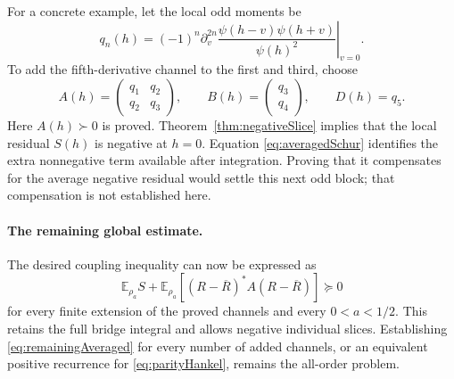 For a concrete example, let the local odd moments be
\[
q_n(h)=(-1)^n\left.\partial_v^{2n}
\frac{\psi(h-v)\psi(h+v)}{\psi(h)^2}\right|_{v=0}.
\]
To add the fifth-derivative channel to the first and third, choose
\[
A(h)=\begin{pmatrix}q_1&q_2\\q_2&q_3\end{pmatrix},
\qquad B(h)=\begin{pmatrix}q_3\\q_4\end{pmatrix},
\qquad D(h)=q_5.
\]
Here $A(h)\succ0$ is proved. Theorem~\ref{thm:negativeSlice} implies that the local residual $S(h)$ is negative at $h=0$. Equation \eqref{eq:averagedSchur} identifies the extra nonnegative term available after integration. Proving that it compensates for the average negative residual would settle this next odd block; that compensation is not established here.

\paragraph{The remaining global estimate.}
The desired coupling inequality can now be expressed as
\begin{equation}\label{eq:remainingAveraged}
\mathbb E_{\rho_a}S+
\mathbb E_{\rho_a}\left[(R-\overline R)^*A(R-\overline R)\right]\succeq0
\end{equation}
for every finite extension of the proved channels and every $0<a<1/2$. This retains the full bridge integral and allows negative individual slices. Establishing \eqref{eq:remainingAveraged} for every number of added channels, or an equivalent positive recurrence for \eqref{eq:parityHankel}, remains the all-order problem.

